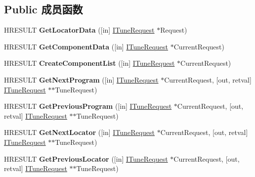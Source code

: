 \subsection*{Public 成员函数}
\begin{DoxyCompactItemize}
\item 
\mbox{\label{interface_i_tune_request_info_acbf6ac1cd5bd54a519e258da7703c039}} 
H\+R\+E\+S\+U\+LT {\bfseries Get\+Locator\+Data} (\mbox{[}in\mbox{]} \hyperlink{interface_i_tune_request}{I\+Tune\+Request} $\ast$Request)
\item 
\mbox{\label{interface_i_tune_request_info_a9181b74cba659b424f3c4063707123dc}} 
H\+R\+E\+S\+U\+LT {\bfseries Get\+Component\+Data} (\mbox{[}in\mbox{]} \hyperlink{interface_i_tune_request}{I\+Tune\+Request} $\ast$Current\+Request)
\item 
\mbox{\label{interface_i_tune_request_info_a0645e30345b2348c9c40f2b1110f71c6}} 
H\+R\+E\+S\+U\+LT {\bfseries Create\+Component\+List} (\mbox{[}in\mbox{]} \hyperlink{interface_i_tune_request}{I\+Tune\+Request} $\ast$Current\+Request)
\item 
\mbox{\label{interface_i_tune_request_info_a09cc2efe52af443b9c437ae213ab6209}} 
H\+R\+E\+S\+U\+LT {\bfseries Get\+Next\+Program} (\mbox{[}in\mbox{]} \hyperlink{interface_i_tune_request}{I\+Tune\+Request} $\ast$Current\+Request, \mbox{[}out, retval\mbox{]} \hyperlink{interface_i_tune_request}{I\+Tune\+Request} $\ast$$\ast$Tune\+Request)
\item 
\mbox{\label{interface_i_tune_request_info_a606804b72fc309053a370912159bf8e8}} 
H\+R\+E\+S\+U\+LT {\bfseries Get\+Previous\+Program} (\mbox{[}in\mbox{]} \hyperlink{interface_i_tune_request}{I\+Tune\+Request} $\ast$Current\+Request, \mbox{[}out, retval\mbox{]} \hyperlink{interface_i_tune_request}{I\+Tune\+Request} $\ast$$\ast$Tune\+Request)
\item 
\mbox{\label{interface_i_tune_request_info_a34f98252c8935d9e30bd987613f59351}} 
H\+R\+E\+S\+U\+LT {\bfseries Get\+Next\+Locator} (\mbox{[}in\mbox{]} \hyperlink{interface_i_tune_request}{I\+Tune\+Request} $\ast$Current\+Request, \mbox{[}out, retval\mbox{]} \hyperlink{interface_i_tune_request}{I\+Tune\+Request} $\ast$$\ast$Tune\+Request)
\item 
\mbox{\label{interface_i_tune_request_info_a11f02f4b3357f1f793848a1cca99edcf}} 
H\+R\+E\+S\+U\+LT {\bfseries Get\+Previous\+Locator} (\mbox{[}in\mbox{]} \hyperlink{interface_i_tune_request}{I\+Tune\+Request} $\ast$Current\+Request, \mbox{[}out, retval\mbox{]} \hyperlink{interface_i_tune_request}{I\+Tune\+Request} $\ast$$\ast$Tune\+Request)
\end{DoxyCompactItemize}
